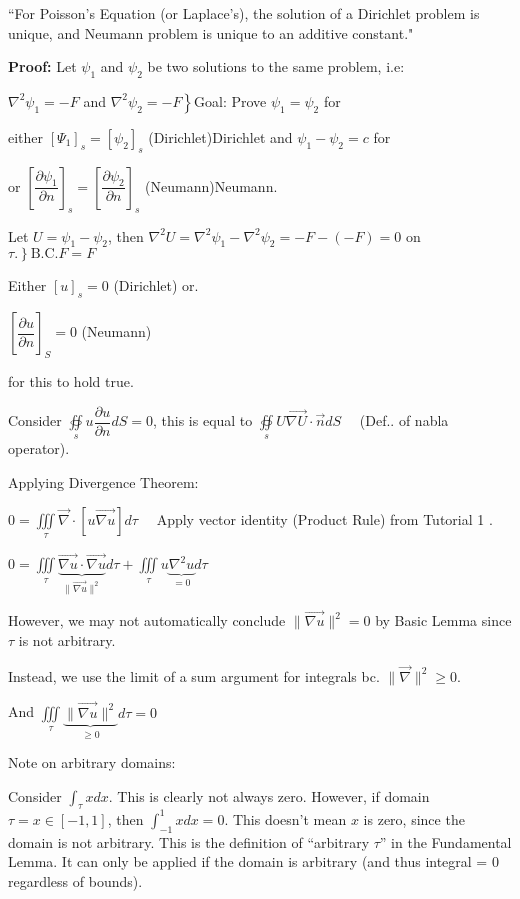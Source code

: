 \documentclass{report}
\begin{document}
``For Poisson's Equation (or Laplace's), the solution of a Dirichlet problem is unique, and Neumann problem is unique to an additive constant."


\textbf{Proof:} Let $\psi_{1}$ and $\psi_{2}$ be two solutions to the same problem, i.e:

$\nabla^{2} \psi_{1}=-F$ and $\left.\nabla^{2} \psi_{2}=-F\right\}$\qquad Goal: Prove $\psi_{1}=\psi_{2}$ for 

either $\left[\Psi_{1}\right]_{s}=\left[\psi_{2}\right]_{s}$ (Dirichlet)\qquad Dirichlet and $\psi_{1}-\psi_{2}=c$ for 

or $\left[\dfrac{\partial \psi_{1}}{\partial n}\right]_{s}=\left[\dfrac{\partial \psi_{2}}{\partial n}\right]_{s}$ (Neumann)\qquad Neumann.

Let $U=\psi_{1}-\psi_{2}$, then $\nabla^{2} U=\nabla^{2} \psi_{1}-\nabla^{2} \psi_{2}=-F-(-F)=0$ on $\left.\tau.\right\} \text{B.C.} F=F$

Either $[u]_{s}=0$ (Dirichlet) 
or. 

$\left[\dfrac{\partial u}{\partial n}\right]_{S}=0$ (Neumann)

for this to hold true.

Consider $\oiint\limits_{s} u \dfrac{\partial u}{\partial n} d S=0$, this is equal to $\oiint\limits_{s} U \overrightarrow{\nabla U} \cdot \vec{n} d S \quad$ (Def.. of nabla operator).

Applying Divergence Theorem:

$0=\iiint\limits_{\tau} \vec{\nabla} \cdot[u \overrightarrow{\nabla u}] d \tau \quad$ Apply vector identity (Product Rule) from Tutorial 1 .


$0=\iiint\limits_{\tau} \underbrace{\overrightarrow{\nabla u} \cdot \overrightarrow{\nabla u}}_{\|\overrightarrow{\nabla u}\|^{2}} d \tau+\iiint\limits_{\tau} u \underbrace{\nabla^{2} u}_{=0} d \tau
$

However, we may not automatically conclude $\|\overrightarrow{\nabla u}\|^{2}=0$ by Basic Lemma since $\tau$ is not arbitrary.

Instead, we use the limit of a sum argument for integrals bc. $\|\vec{\nabla}\|^{2} \geqslant 0$.

And $\iiint\limits_{\tau} \underbrace{\|\vec{\nabla u}\|^{2}}_{\geq 0} d \tau=0 \quad$ 

Note on arbitrary domains:

Consider $\displaystyle\int_{\tau} x d x$. This is clearly not always zero. However, if domain $\tau=x \in[-1,1]$, then $\displaystyle\int_{-1}^{1} x d x=0$. This doesn't mean $x$ is zero, since the domain is not arbitrary. This is the definition of ``arbitrary $\tau$'' in the Fundamental Lemma. It can only be applied if the domain is arbitrary (and thus integral = 0 regardless of bounds).
\end{document}
